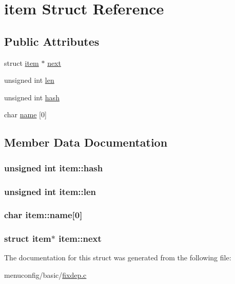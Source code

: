 \hypertarget{structitem}{\section{item Struct Reference}
\label{structitem}
}
\subsection*{Public Attributes}
\begin{DoxyCompactItemize}
\item 
struct \hyperlink{structitem}{item} $\ast$ \hyperlink{structitem_a975a1b37d9e003e1abb2a505474894b5}{next}
\item 
unsigned int \hyperlink{structitem_a9fa7ee53e8ed3d09e3a1ef8d3797ceec}{len}
\item 
unsigned int \hyperlink{structitem_acf62b655b5d783ce09b9deca4521b74d}{hash}
\item 
char \hyperlink{structitem_af4d4eb9429339815e359964718bb2317}{name} \mbox{[}0\mbox{]}
\end{DoxyCompactItemize}


\subsection{Member Data Documentation}
\hypertarget{structitem_acf62b655b5d783ce09b9deca4521b74d}{
\subsubsection[{hash}]{\setlength{\rightskip}{0pt plus 5cm}unsigned int item\-::hash}}\label{structitem_acf62b655b5d783ce09b9deca4521b74d}
\hypertarget{structitem_a9fa7ee53e8ed3d09e3a1ef8d3797ceec}{
\subsubsection[{len}]{\setlength{\rightskip}{0pt plus 5cm}unsigned int item\-::len}}\label{structitem_a9fa7ee53e8ed3d09e3a1ef8d3797ceec}
\hypertarget{structitem_af4d4eb9429339815e359964718bb2317}{
\subsubsection[{name}]{\setlength{\rightskip}{0pt plus 5cm}char item\-::name\mbox{[}0\mbox{]}}}\label{structitem_af4d4eb9429339815e359964718bb2317}
\hypertarget{structitem_a975a1b37d9e003e1abb2a505474894b5}{
\subsubsection[{next}]{\setlength{\rightskip}{0pt plus 5cm}struct {\bf item}$\ast$ item\-::next}}\label{structitem_a975a1b37d9e003e1abb2a505474894b5}


The documentation for this struct was generated from the following file\-:\begin{DoxyCompactItemize}
\item 
menuconfig/basic/\hyperlink{fixdep_8c}{fixdep.\-c}\end{DoxyCompactItemize}
